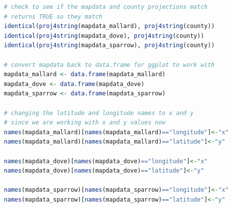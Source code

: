 \documentclass[letterpaper]{article}
\begin{document}
\begin{lstlisting}[language=R]
# check to see if the mapdata and county projections match
# returns TRUE so they match
identical(proj4string(mapdata_mallard), proj4string(county))
identical(proj4string(mapdata_dove), proj4string(county))
identical(proj4string(mapdata_sparrow), proj4string(county))

# convert mapdata back to data.frame for ggplot to work with
mapdata_mallard <- data.frame(mapdata_mallard)
mapdata_dove <- data.frame(mapdata_dove)
mapdata_sparrow <- data.frame(mapdata_sparrow)

# changing the latitude and longitude names to x and y
# since we are working with x and y values now
names(mapdata_mallard)[names(mapdata_mallard)=="longitude"]<-"x"
names(mapdata_mallard)[names(mapdata_mallard)=="latitude"]<-"y"

names(mapdata_dove)[names(mapdata_dove)=="longitude"]<-"x"
names(mapdata_dove)[names(mapdata_dove)=="latitude"]<-"y"

names(mapdata_sparrow)[names(mapdata_sparrow)=="longitude"]<-"x"
names(mapdata_sparrow)[names(mapdata_sparrow)=="latitude"]<-"y"


\end{lstlisting}
\end{document}
